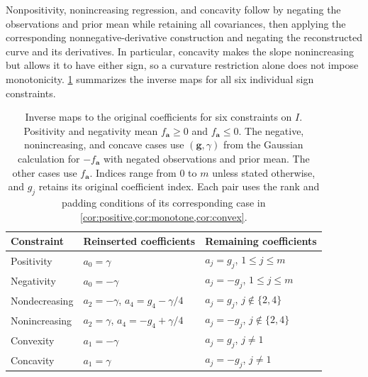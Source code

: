 Nonpositivity, nonincreasing regression, and concavity follow by negating
the observations and prior mean while retaining all covariances, then
applying the corresponding nonnegative-derivative construction and
negating the reconstructed curve and its derivatives. In particular,
concavity makes the slope nonincreasing but allows it to have either
sign, so a curvature restriction alone does not impose monotonicity.
\cref{tab:coefficient-reconstruction} summarizes the inverse maps for
all six individual sign constraints.

\begin{table}[htbp]
\centering
\small
\begin{tabular}{@{}lll@{}}
\toprule
Constraint & Reinserted coefficients & Remaining coefficients\\
\midrule
Positivity & $a_0=\gamma$
  & $a_j=g_j$, $1\leq j\leq m$\\
Negativity & $a_0=-\gamma$
  & $a_j=-g_j$, $1\leq j\leq m$\\
\addlinespace
Nondecreasing & $a_2=-\gamma$, $a_4=g_4-\gamma/4$
  & $a_j=g_j$, $j\notin\{2,4\}$\\
Nonincreasing & $a_2=\gamma$, $a_4=-g_4+\gamma/4$
  & $a_j=-g_j$, $j\notin\{2,4\}$\\
\addlinespace
Convexity & $a_1=-\gamma$
  & $a_j=g_j$, $j\ne1$\\
Concavity & $a_1=\gamma$
  & $a_j=-g_j$, $j\ne1$\\
\bottomrule
\end{tabular}
\caption[Reconstruction for six sign constraints]{Inverse maps to the
original coefficients for six constraints on $I$. Positivity and
negativity mean $f_{\boldsymbol a}\geq0$ and $f_{\boldsymbol a}\leq0$.
The negative, nonincreasing, and concave cases use
$(\boldsymbol g,\gamma)$ from the Gaussian calculation for
$-f_{\boldsymbol a}$ with negated observations and prior mean.
The other cases use $f_{\boldsymbol a}$. Indices range from $0$ to $m$
unless stated otherwise, and $g_j$ retains its original coefficient
index. Each pair uses the rank and padding conditions of its
corresponding case in \cref{cor:positive,cor:monotone,cor:convex}.}
\label{tab:coefficient-reconstruction}
\end{table}

